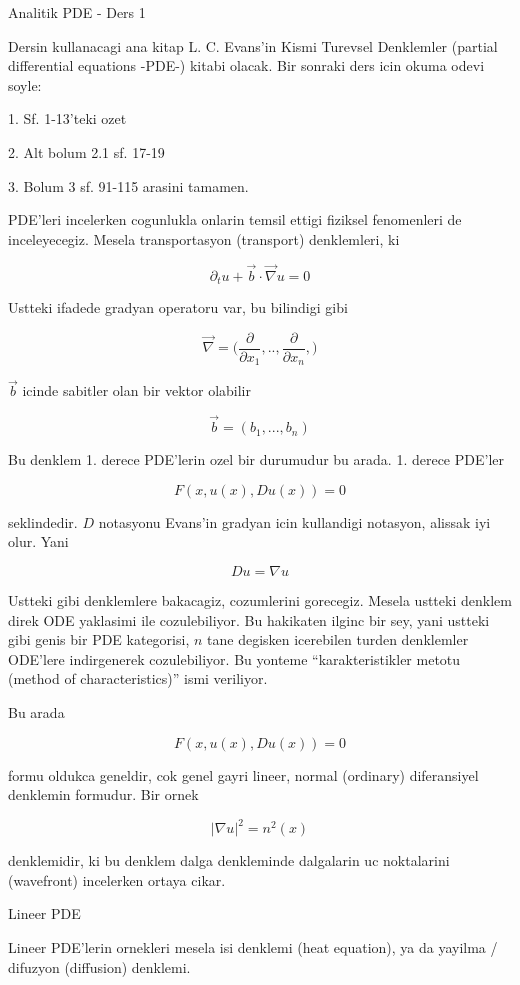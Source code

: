 \documentclass[12pt,fleqn]{article}\usepackage{../common}
\begin{document}
Analitik PDE - Ders 1

Dersin kullanacagi ana kitap L. C. Evans'in Kismi Turevsel Denklemler
(partial differential equations -PDE-) kitabi olacak. Bir sonraki ders icin
okuma odevi soyle:

1. Sf. 1-13'teki ozet

2. Alt bolum 2.1 sf. 17-19

3. Bolum 3 sf. 91-115 arasini tamamen. 

PDE'leri incelerken cogunlukla onlarin temsil ettigi fiziksel fenomenleri
de inceleyecegiz. Mesela transportasyon (transport) denklemleri, ki

\[ \partial_t u + \vec{b} \cdot \vec{\nabla} u = 0 \]

Ustteki ifadede gradyan operatoru var, bu bilindigi gibi

\[ \vec{\nabla} = \bigg( 
\frac{\partial }{\partial x_1},.., 
\frac{\partial }{\partial x_n},
\bigg)
\]

$\vec{b}$ icinde sabitler olan bir vektor olabilir

\[ \vec{b} = (b_1,...,b_n)
 \]

Bu denklem 1. derece PDE'lerin ozel bir durumudur bu arada. 1. derece
PDE'ler 

\[ F(x, u(x), Du(x)) = 0 \]

seklindedir. $D$ notasyonu Evans'in gradyan icin kullandigi notasyon,
alissak iyi olur. Yani

\[ Du = \nabla u \]

Ustteki gibi denklemlere bakacagiz, cozumlerini gorecegiz. Mesela ustteki
denklem direk ODE yaklasimi ile cozulebiliyor. Bu hakikaten ilginc bir sey,
yani ustteki gibi genis bir PDE kategorisi, $n$ tane degisken icerebilen
turden denklemler ODE'lere indirgenerek cozulebiliyor. Bu yonteme
``karakteristikler metotu (method of characteristics)'' ismi veriliyor.

Bu arada

\[ F(x, u(x), Du(x)) = 0 \]

formu oldukca geneldir, cok genel gayri lineer, normal (ordinary)
diferansiyel denklemin formudur. Bir ornek

\[ |\nabla u|^2 = n^2(x) \]

denklemidir, ki bu denklem dalga denkleminde dalgalarin uc noktalarini
(wavefront) incelerken ortaya cikar. 

Lineer PDE

Lineer PDE'lerin ornekleri mesela isi denklemi (heat equation), ya da
yayilma / difuzyon (diffusion) denklemi.
\end{document}
